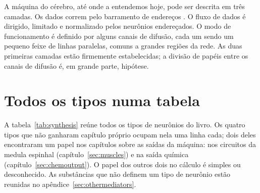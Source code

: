 \begin{keyblock}
\begin{proposition}[Arquitetura]
\label{prop:architecture}
A máquina do cérebro, até onde a entendemos hoje, pode ser descrita em três camadas. Os dados correm pelo barramento de endereços . O fluxo de dados é dirigido, limitado e normalizado pelos neurônios  endereçados. O modo de funcionamento é definido por alguns canais de difusão, cada um sendo um pequeno feixe de linhas paralelas, comuns a grandes regiões da rede. As duas primeiras camadas estão firmemente estabelecidas; a divisão de papéis entre os canais de difusão é, em grande parte, hipótese.
\end{proposition}
\end{keyblock}

\section{Todos os tipos numa tabela}

A tabela~\ref{tab:synthesis} reúne todos os tipos de neurônios do livro. Os quatro tipos que não ganharam capítulo próprio ocupam nela uma linha cada; dois deles encontraram um papel nos capítulos sobre as saídas da máquina:  nos circuitos da medula espinhal (capítulo~\ref{sec:muscles}) e  na saída química (capítulo~\ref{sec:chemoutput}). O papel dos outros dois no cálculo é simples ou desconhecido. As substâncias que não definem um tipo de neurônio estão reunidas no apêndice~\ref{sec:othermediators}.

